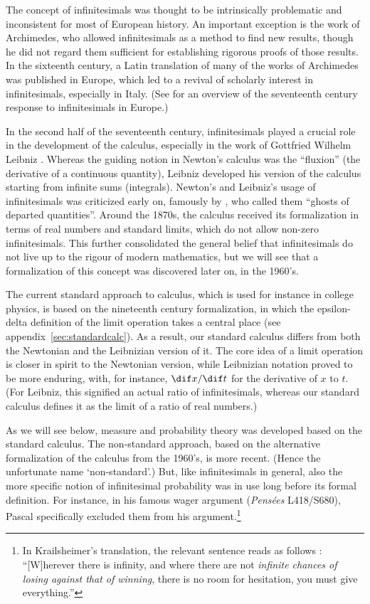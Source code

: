The concept of infinitesimals was thought to be intrinsically problematic and inconsistent for most of European history. An important exception is the work of Archimedes, who allowed infinitesimals as a method to find new results, though he did not regard them sufficient for establishing rigorous proofs of those results. In the sixteenth century, a Latin translation of many of the works of Archimedes was published in Europe, which led to a revival of scholarly interest in infinitesimals, especially in Italy. (See \citealt{Alexander:2014} for an overview of the seventeenth century response to infinitesimals in Europe.)

In the second half of the seventeenth century, infinitesimals played a crucial role in the development of the calculus, especially in the work of Gottfried Wilhelm Leibniz \citep[see, \textit{e.g.},][]{KatzSherry:2012a,KatzSherry:2013}.
Whereas the guiding notion in Newton's calculus was the ``fluxion'' (the derivative of a continuous quantity), Leibniz developed his version of the calculus starting from infinite sums (integrals). Newton's and Leibniz's usage of infinitesimals was criticized early on, famously by \citet{Berkeley:1734}, who called them ``ghosts of departed quantities''.
Around the 1870s, the calculus received its formalization in terms of real numbers and standard limits, which do not allow non-zero infinitesimals. This further consolidated the general belief that infinitesimals do not live up to the rigour of modern mathematics, but we will see that a formalization of this concept was discovered later on, in the 1960's.

The current standard approach to calculus, which is used for instance in college physics, is based on the nineteenth century formalization, in which the epsilon-delta definition of the limit operation takes a central place (see appendix~\ref{sec:standardcalc}). As a result, our standard calculus differs from both the Newtonian and the Leibnizian version of it. The core idea of a limit operation is closer in spirit to the Newtonian version, while Leibnizian notation proved to be more enduring, with, for instance, $\dif x/\dif t$ for the derivative of $x$ to $t$. (For Leibniz, this signified an actual ratio of infinitesimals, whereas our standard calculus defines it as the limit of a ratio of real numbers.)

As we will see below, measure and probability theory was developed based on the standard calculus. The non-standard approach, based on the alternative formalization of the calculus from the 1960's, is more recent. (Hence the unfortunate name `non-standard'.) But, like infinitesimals in general, also the more specific notion of infinitesimal probability was in use long before its formal definition. For instance, in his famous wager argument (\textit{Pens{\'e}es} L418/S680), Pascal specifically excluded them from his argument.\footnote{In Krailsheimer's translation, the relevant sentence reads as follows \citep[p.~151, my emphasis]{Krailsheimer:1995}: ``[W]herever there is infinity, and where there are not \emph{infinite chances of losing against that of winning}, there is no room for hesitation, you must give everything.''}


